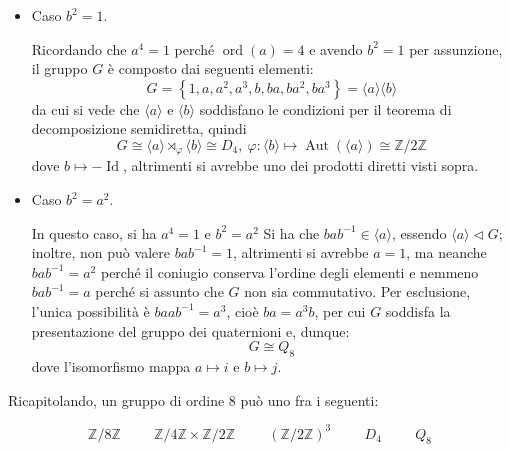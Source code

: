 \documentclass[12pt]{scrartcl}
\theoremstyle{style}
\newenvironment{boxenv}[1][]{
    \begin{eqbox}[#1]
    }{
   \end{eqbox}
}
\numberwithin{equation}{subsection}
\begin{document}
\begin{itemize}
	\item Caso $b^2 = 1$.

		Ricordando che $a^4 = 1$ perch\'e $\operatorname{ord}(a) = 4$ e avendo $b^2 = 1$ per assunzione, il gruppo $G$ \`e composto dai seguenti elementi:
		\[
		G = \left\{ 1 , a , a^2 , a^3, b , ba , ba^2 , ba^3 \right\}  = \langle a \rangle\langle b \rangle
		\] 
		da cui si vede che $\langle a \rangle$ e $\langle b \rangle$  soddisfano le condizioni per il teorema di decomposizione semidiretta, quindi
		\[
			G \cong \langle a \rangle \rtimes_\varphi  \langle b \rangle\cong D_{4} , \ \varphi : \langle b \rangle \longmapsto \operatorname{Aut} (\langle a \rangle)\cong \mathbb{Z}/2\mathbb{Z} 
		\] 
		dove $b\mapsto -\operatorname{Id} $, altrimenti si avrebbe uno dei prodotti diretti visti sopra.
	\item Caso $b^2 = a^2$.

		In questo caso, si ha $a^4 = 1 $ e $b^2 = a^2$
		Si ha che $bab^{-1}\in \langle a \rangle$, essendo $\langle a \rangle\lhd G$; inoltre, non pu\`o valere $bab^{-1}=1$, altrimenti si avrebbe $a=1$, ma neanche $bab^{-1}=a^2$ perch\'e il coniugio conserva l'ordine degli elementi e nemmeno $bab^{-1}=a$ perch\'e si assunto che $G$ non sia commutativo.
		Per esclusione, l'unica possibilit\`a \`e $baab^{-1}= a^3$, cio\`e $ba= a^3 b$, per cui $G$ soddisfa la presentazione del gruppo dei quaternioni e, dunque:
		\[
		G \cong Q_8
		\] 
		dove l'isomorfismo mappa $a \mapsto i$ e $b\mapsto j$.
\end{itemize}
Ricapitolando, un gruppo di ordine $8$ pu\`o uno fra i seguenti:
\begin{boxenv}[]
\[
\mathbb{Z}/8\mathbb{Z} \hspace{1cm} \mathbb{Z}/4\mathbb{Z} \times \mathbb{Z}/2\mathbb{Z} \hspace{1cm} (\mathbb{Z}/2\mathbb{Z})^3 \hspace{1cm} D_4 \hspace{1cm}Q_8
\] 
\end{boxenv}
\end{document}
